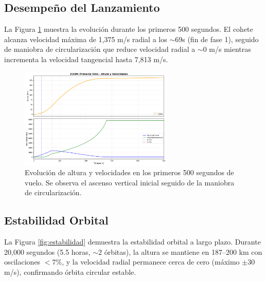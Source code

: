\documentclass[10pt,a4paper]{article}
\begin{document}
\subsection{Desempeño del Lanzamiento}
La Figura \ref{fig:despegue} muestra la evolución durante los primeros 500 segundos. El cohete alcanza velocidad máxima de 1,375 m/s radial a los $\sim$69s (fin de fase 1), seguido de maniobra de circularización que reduce velocidad radial a $\sim$0 m/s mientras incrementa la velocidad tangencial hasta 7,813 m/s.

\begin{figure}[H]
\centering
\includegraphics[width=0.65\textwidth]{../graficos/12_altura_velocidad_zoom_500s.png}
\caption{Evolución de altura y velocidades en los primeros 500 segundos de vuelo. Se observa el ascenso vertical inicial seguido de la maniobra de circularización.}
\label{fig:despegue}
\end{figure}

\subsection{Estabilidad Orbital}
La Figura \ref{fig:estabilidad} demuestra la estabilidad orbital a largo plazo. Durante 20,000 segundos (5.5 horas, $\sim$2 órbitas), la altura se mantiene en 187--200 km con oscilaciones $<7\%$, y la velocidad radial permanece cerca de cero (máximo $\pm$30 m/s), confirmando órbita circular estable.
\end{document}
